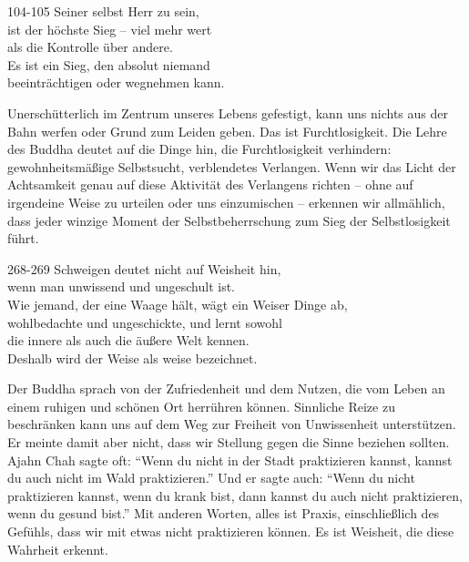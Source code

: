 
\begin{dhpVerse}{104-105}
\label{dhp-104}\label{dhp-105}
Seiner selbst Herr zu sein,\\ 
ist der höchste Sieg -- viel mehr wert\\ 
als die Kontrolle über andere.\\ 
Es ist ein Sieg, den absolut niemand\\ 
beeinträchtigen oder wegnehmen kann. 
\end{dhpVerse}

\begin{dhpRefl}

Unerschütterlich im Zentrum unseres Lebens gefestigt, kann uns nichts aus der
Bahn werfen oder Grund zum Leiden geben. Das ist Furchtlosigkeit. Die Lehre
des Buddha deutet auf die Dinge hin, die Furchtlosigkeit verhindern:
gewohnheitsmäßige Selbstsucht, verblendetes Verlangen. Wenn wir das Licht der
Achtsamkeit genau auf diese Aktivität des Verlangens richten -- ohne auf
irgendeine Weise zu urteilen oder uns einzumischen -- erkennen wir allmählich,
dass jeder winzige Moment der Selbstbeherrschung zum Sieg der Selbstlosigkeit
führt.

\end{dhpRefl}


\begin{dhpVerse}{268-269}
\label{dhp-268}\label{dhp-269}
Schweigen deutet nicht auf Weisheit hin,\\ 
wenn man unwissend und ungeschult ist.\\ 
Wie jemand, der eine Waage hält, wägt ein Weiser Dinge ab,\\ 
wohlbedachte und ungeschickte, und lernt sowohl\\ 
die innere als auch die äußere Welt kennen.\\ 
Deshalb wird der Weise als weise bezeichnet. 
\end{dhpVerse}

\begin{dhpRefl}

Der Buddha sprach von der Zufriedenheit und dem Nutzen, die vom Leben an einem
ruhigen und schönen Ort herrühren können. Sinnliche Reize zu beschränken kann
uns auf dem Weg zur Freiheit von Unwissenheit unterstützen. Er meinte damit
aber nicht, dass wir Stellung gegen die Sinne beziehen sollten. Ajahn Chah
sagte oft: “Wenn du nicht in der Stadt praktizieren kannst, kannst du auch
nicht im Wald praktizieren.” Und er sagte auch: “Wenn du nicht praktizieren
kannst, wenn du krank bist, dann kannst du auch nicht praktizieren, wenn du
gesund bist.” Mit anderen Worten, alles ist Praxis, einschließlich des
Gefühls, dass wir mit etwas nicht praktizieren können. Es ist Weisheit, die
diese Wahrheit erkennt.

\end{dhpRefl}

